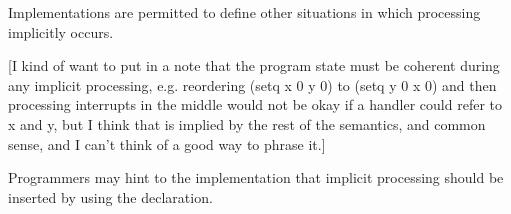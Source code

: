 Implementations are permitted to define other situations in which
 processing implicitly occurs.

[I kind of want to put in a note that the program state must be coherent during
any implicit processing, e.g. reordering (setq x 0 y 0) to (setq y 0 x 0) and
then processing interrupts in the middle would not be okay if a handler could
refer to x and y, but I think that is implied by the rest of the semantics, and
common sense, and I can't think of a good way to phrase it.]

Programmers may hint to the implementation that implicit processing should be
inserted by using the  declaration.

\endsubsubsection%

\endsubsection%